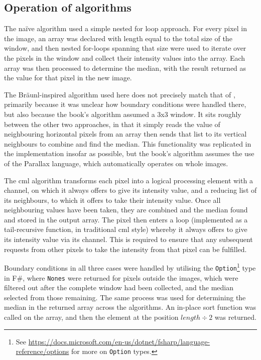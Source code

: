 \subsection{Operation of algorithms}
The na\"{i}ve algorithm used a simple nested for loop approach.  For every pixel in the image, an array was declared with length equal to the total size of the window, and then nested for-loops spanning that size were used to iterate over the pixels in the window and collect their intensity values into the array.  Each array was then processed to determine the median, with the result returned as the value for that pixel in the new image.

The Bräunl-inspired algorithm used here does not precisely match that of \cite{Braunl2001}, primarily because it was unclear how boundary conditions were handled there, but also because the book's algorithm assumed a 3x3 window.  It sits roughly between the other two approaches, in that it simply reads the value of neighbouring horizontal pixels from an array then sends that list to its vertical neighbours to combine and find the median.  This functionality was replicated in the implementation insofar as possible, but the book's algorithm assumes the use of the Parallax language, which automatically operates on whole images.

The \gls{cml} algorithm transforms each pixel into a logical processing element with a channel, on which it always offers to give its intensity value, and a reducing list of its neighbours, to which it offers to take their intensity value.  Once all neighbouring values have been taken, they are combined and the median found and stored in the output array.  The pixel then enters a loop (implemented as a tail-recursive function, in traditional \gls{cml} style) whereby it always offers to give its intensity value via its channel.  This is required to ensure that any subsequent requests from other pixels to take the intensity from that pixel can be fulfilled.

Boundary conditions in all three cases were handled by utilising the \texttt{Option}\footnote{See \url{https://docs.microsoft.com/en-us/dotnet/fsharp/language-reference/options} for more on \texttt{Option} types.} type in F\#, where \texttt{Nones} were returned for pixels outside the images, which were filtered out after the complete window had been collected, and the median selected from those remaining.  The same process was used for determining the median in the returned array across the algorithms.  An in-place sort function was called on the array, and then the element at the position $length \div 2$ was returned.

